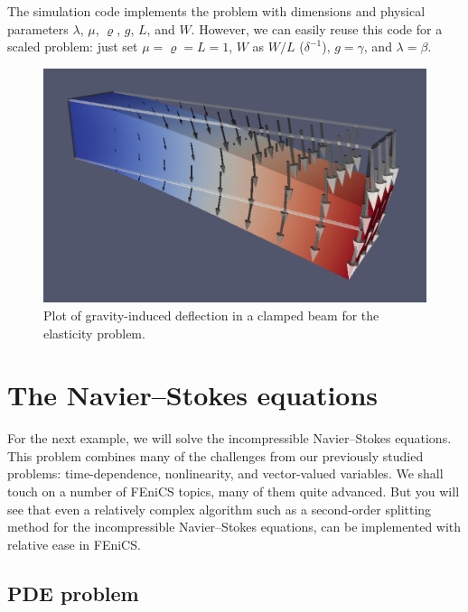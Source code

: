 \documentclass[graybox,envcountchap,sectrefs,final]{svmonodo}
\begin{document}
The simulation code implements the problem with dimensions and
physical parameters $\lambda$, $\mu$, $\varrho$, $g$, $L$, and $W$.
However, we can easily reuse this code for a scaled problem: just set
$\mu = \varrho = L = 1$, $W$ as $W/L$ ($\delta^{-1}$), $g=\gamma$, and
$\lambda=\beta$.


\begin{figure}[!ht]  %
  \centerline{\includegraphics[width=0.95\linewidth]{fig/elasticity.png}}
  \caption{
  Plot of gravity-induced deflection in a clamped beam for the elasticity problem.
  }
\end{figure}



\section{The Navier--Stokes equations}
\label{ftut1:NS}


For the next example, we will solve the incompressible Navier--Stokes
equations. This problem combines many of the challenges from our
previously studied problems: time-dependence, nonlinearity, and
vector-valued variables. We shall touch on a number of FEniCS topics,
many of them quite advanced. But you will see that even a relatively
complex algorithm such as a second-order splitting method for the
incompressible Navier--Stokes equations, can be implemented with
relative ease in FEniCS.

\subsection{PDE problem}
\end{document}
